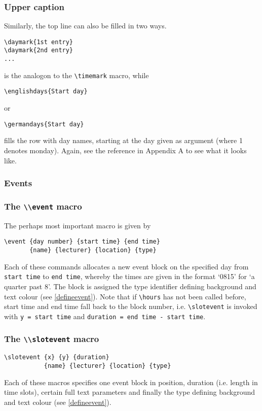 \documentclass[a4paper,10pt]{article}
\begin{document}
\subsubsection{Upper caption}
Similarly, the top line can also be filled in two ways.
\begin{lstlisting}
\daymark{1st entry}
\daymark{2nd entry}
...
\end{lstlisting}
is the analogon to the \lstinline{\timemark} macro, while
\begin{lstlisting}
\englishdays{Start day}
\end{lstlisting}
or
\begin{lstlisting}
\germandays{Start day}
\end{lstlisting}
fills the row with day names, starting at the day given as argument (where 1 denotes monday). Again, see the reference in Appendix A to see what it looks like.

\subsubsection{Events}
\subsubsection*{The \lstinline{\\event} macro}
The perhaps most important macro is given by
\begin{lstlisting}
\event {day number} {start time} {end time}
       {name} {lecturer} {location} {type}
\end{lstlisting}
Each of these commands allocates a new event block on the specified day from \lstinline{start time} to \lstinline{end time}, whereby the times are given in the format `0815' for `a quarter past 8'. The block is assigned the type identifier defining background and text colour (see \ref{defineevent}). Note that if \lstinline{\hours} has not been called before, start time and end time fall back to the block number, i.e. \lstinline{\slotevent} is invoked with \lstinline{y = start time} and \lstinline{duration = end time - start time}.

\subsubsection*{The \lstinline{\\slotevent} macro}
\begin{lstlisting}
\slotevent {x} {y} {duration}
           {name} {lecturer} {location} {type}
\end{lstlisting}
Each of these macros specifies one event block in position, duration (i.e. length in time slots), certain full text parameters and finally the type defining background and text colour (see \ref{defineevent}).
\end{document}
